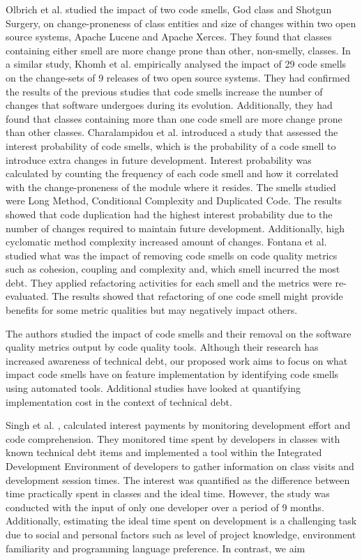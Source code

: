 Olbrich et al. \cite{Olbrich2009} studied the impact of two code smells, God
class and Shotgun Surgery, on change-proneness of class entities and size of
changes within two open source systems, Apache Lucene and Apache Xerces. They
found that classes containing either smell are more change prone than other,
non-smelly, classes. In a similar study, Khomh et al. \cite{Khomh2009}
empirically analysed the impact of 29 code smells on the change-sets of 9
releases of two open source systems. They had confirmed the results of the
previous studies that code smells increase the number of changes that software
undergoes during its evolution. Additionally, they had found that classes
containing more than one code smell are more change prone than other classes.
Charalampidou et al. \cite{Charalampidou2017} introduced a study that assessed
the interest probability of code smells, which is the probability of a code
smell to introduce extra changes in future development. Interest probability was
calculated by counting the frequency of each code smell and how it correlated
with the change-proneness of the module where it resides. The smells studied
were Long Method, Conditional Complexity and Duplicated Code. The results showed
that code duplication had the highest interest probability due to the number of
changes required to maintain future development. Additionally, high cyclomatic
method complexity increased amount of changes. Fontana et al. \cite{Fontana2012}
studied what was the impact of removing code smells on code quality metrics such
as cohesion, coupling and complexity and, which smell incurred the most debt.
They applied refactoring activities for each smell and the metrics were
re-evaluated. The results showed that refactoring of one code smell might
provide benefits for some metric qualities but may negatively impact others.

The authors studied the impact of code smells and their removal on the software
quality metrics output by code quality tools. Although their research has
increased awareness of technical debt, our proposed work aims to focus on what
impact code smells have on feature implementation by identifying code smells
using automated tools. Additional studies have looked at quantifying
implementation cost in the context of technical debt.

Singh et al. \cite{Singh2014}, calculated interest payments by monitoring
development effort and code comprehension. They monitored time spent by
developers in classes with known technical debt items and implemented a tool
within the Integrated Development Environment of developers to gather
information on class visits and development session times. The interest was
quantified as the difference between time practically spent in classes and the
ideal time. However, the study was conducted with the input of only one
developer over a period of 9 months. Additionally, estimating the ideal time
spent on development is a challenging task due to social and personal factors
such as level of project knowledge, environment familiarity and programming
language preference. In contrast, we aim 

